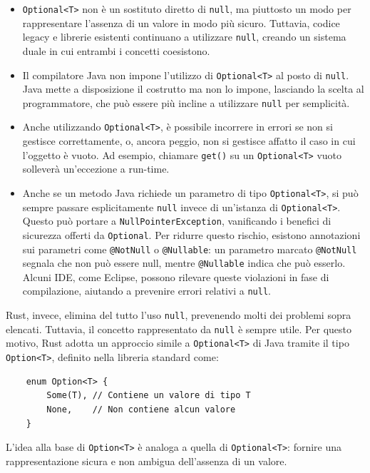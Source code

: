 \begin{itemize}
    \item \texttt{Optional<T>} non è un sostituto diretto di \texttt{null}, ma piuttosto un modo per rappresentare l'assenza di un valore in modo più sicuro. Tuttavia, codice legacy e librerie esistenti continuano a utilizzare \texttt{null}, creando un sistema duale in cui entrambi i concetti coesistono.
    \item Il compilatore Java non impone l'utilizzo di \texttt{Optional<T>} al posto di \texttt{null}. Java mette a disposizione il costrutto ma non lo impone, lasciando la scelta al programmatore, che può essere più incline a utilizzare \texttt{null} per semplicità.
    \item Anche utilizzando \texttt{Optional<T>}, è possibile incorrere in errori se non si gestisce correttamente, o, ancora peggio, non si gestisce affatto il caso in cui l'oggetto è vuoto. Ad esempio, chiamare \texttt{get()} su un \texttt{Optional<T>} vuoto solleverà un'eccezione a run-time. 
        \item Anche se un metodo Java richiede un parametro di tipo \texttt{Optional<T>}, si può sempre passare esplicitamente \texttt{null} invece di un'istanza di \texttt{Optional<T>}. Questo può portare a \texttt{NullPointerException}, vanificando i benefici di sicurezza offerti da \texttt{Optional}. Per ridurre questo rischio, esistono annotazioni sui parametri come \texttt{@NotNull} o \texttt{@Nullable}: un parametro marcato \texttt{@NotNull} segnala che non può essere null, mentre \texttt{@Nullable} indica che può esserlo. Alcuni IDE, come Eclipse, possono rilevare queste violazioni in fase di compilazione, aiutando a prevenire errori relativi a \texttt{null}.
\end{itemize}
Rust, invece, elimina del tutto l'uso \texttt{null}, prevenendo molti dei problemi sopra elencati. Tuttavia, il concetto rappresentato da \texttt{null} è sempre utile. Per questo motivo, Rust adotta un approccio simile a \texttt{Optional<T>} di Java tramite il tipo \texttt{Option<T>}, definito nella libreria standard come:
\begin{verbatim}
    enum Option<T> {
        Some(T), // Contiene un valore di tipo T
        None,    // Non contiene alcun valore
    }
\end{verbatim}
L'idea alla base di \texttt{Option<T>} è analoga a quella di \texttt{Optional<T>}: fornire una rappresentazione sicura e non ambigua dell'assenza di un valore.

